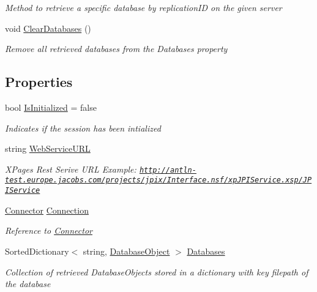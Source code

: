 \begin{DoxyCompactItemize}
\begin{DoxyCompactList}\small\item\em Method to retrieve a specific database by replication\+ID on the given server \end{DoxyCompactList}\item 
void \mbox{\hyperlink{class_session_object_a7a13510147dc63acd76f3015b6f8e409}{Clear\+Databases}} ()
\begin{DoxyCompactList}\small\item\em Remove all retrieved databases from the \textquotesingle{}Databases\textquotesingle{} property \end{DoxyCompactList}\end{DoxyCompactItemize}
\subsection*{Properties}
\begin{DoxyCompactItemize}
\item 
bool \mbox{\hyperlink{class_session_object_ae0885b9054fc3ce287307ac16ff69990}{Is\+Initialized}} = false
\begin{DoxyCompactList}\small\item\em Indicates if the session has been intialized \end{DoxyCompactList}\item 
string \mbox{\hyperlink{class_session_object_a697c071c812fbf7ad1166b896fb44c16}{Web\+Service\+U\+RL}}
\begin{DoxyCompactList}\small\item\em X\+Pages Rest Serive U\+RL Example\+: \href{http://antln-test.europe.jacobs.com/projects/jpix/Interface.nsf/xpJPIService.xsp/JPIService}{\tt http\+://antln-\/test.\+europe.\+jacobs.\+com/projects/jpix/\+Interface.\+nsf/xp\+J\+P\+I\+Service.\+xsp/\+J\+P\+I\+Service} \end{DoxyCompactList}\item 
\mbox{\hyperlink{class_connector}{Connector}} \mbox{\hyperlink{class_session_object_a014bdbf705a753540e19bfb53030c55c}{Connection}}
\begin{DoxyCompactList}\small\item\em Reference to \mbox{\hyperlink{class_connector}{Connector}} \end{DoxyCompactList}\item 
Sorted\+Dictionary$<$ string, \mbox{\hyperlink{class_database_object}{Database\+Object}} $>$ \mbox{\hyperlink{class_session_object_aa0b75f5b9d0a6325f436e08db27204a2}{Databases}}
\begin{DoxyCompactList}\small\item\em Collection of retrieved Database\+Objects stored in a dictionary with key filepath of the database \end{DoxyCompactList}\end{DoxyCompactItemize}


